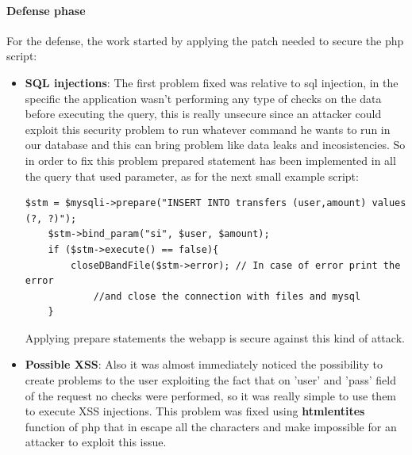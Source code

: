 \documentclass[14pt]{article}
\begin{document}
\paragraph{Defense phase}
For the defense, the work started by applying the patch needed to secure the php script:
\begin{itemize}
	\item \textbf{SQL injections}: The first problem fixed was relative to sql injection, in the specific the application wasn't performing any type of checks on the data before executing the query, this is really unsecure since an attacker could exploit this security problem to run whatever command he wants to run in our database and this can bring problem like data leaks and incosistencies. So in order to fix this problem prepared statement has been implemented in all the query that used parameter, as for the next small example script:
	\begin{Verbatim}[tabsize=4]
	$stm = $mysqli->prepare("INSERT INTO transfers (user,amount) values (?, ?)");
	$stm->bind_param("si", $user, $amount);
	if ($stm->execute() == false){
		closeDBandFile($stm->error); // In case of error print the error 
			//and close the connection with files and mysql 
	}
	\end{Verbatim}
	Applying prepare statements the webapp is secure against this kind of attack.
	
	\item \textbf{Possible XSS}: Also it was almost immediately noticed the possibility to create problems to the user exploiting the fact that on 'user' and 'pass' field of the request no checks were performed, so it was really simple to use them to execute XSS injections. This problem was fixed using \textbf{htmlentites} function of php that in escape all the characters and make impossible for an attacker to exploit this issue.
	

\end{itemize}
\end{document}
